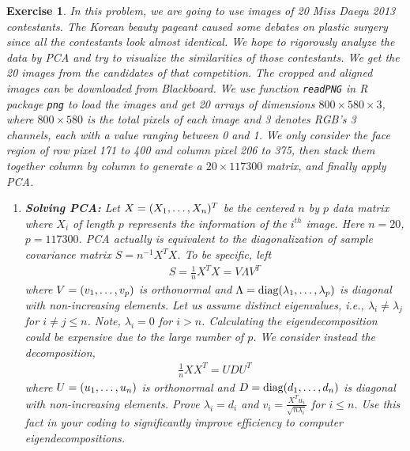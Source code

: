 \documentclass[12pt]{article}
\theoremstyle{colon}
\newtheorem{exercise}{Exercise}
\begin{document}
\begin{exercise}
  In this problem, we are going to use images of 20 Miss Daegu 2013 contestants. The Korean beauty pageant caused some debates on plastic surgery since all the contestants look almost identical. We hope to rigorously analyze the data by PCA and try to visualize the similarities of those contestants. We get the 20 images from the candidates of that competition. The cropped and aligned images can be downloaded from Blackboard. We use function \texttt{readPNG} in R package \texttt{png} to load the images and get 20 arrays of dimensions $800 \times 580 \times 3$, where $800 \times 580$ is the total pixels of each image and 3 denotes RGB's 3 channels, each with a value ranging between 0 and 1. We only consider the face region of row pixel 171 to 400 and column pixel 206 to 375, then stack them together column by column to generate a $20 \times 117300$ matrix, and finally apply PCA.
  \begin{enumerate}[label=\arabic*)]
    \item \textbf{Solving PCA:} Let $X = (X_1, \mathellipsis, X_n)^T$ be the centered $n$ by $p$ data matrix where $X_i$ of length $p$ represents the information of the $i^{th}$ image. Here $n = 20$, $p = 117300$. PCA actually is equivalent to the diagonalization of sample covariance matrix $S = n^{-1} X^T X$. To be specific, left
      \begin{gather*}
        S = \frac{1}{n} X^T X = V \Lambda V^T
      \end{gather*}
      where $V = (v_1, \mathellipsis, v_p)$ is orthonormal and $\Lambda = \text{diag}(\lambda_1, \mathellipsis, \lambda_p)$ is diagonal with non-increasing elements. Let us assume distinct eigenvalues, i.e., $\lambda_i \neq \lambda_j$ for $i \neq j \leq n$. Note, $\lambda_i = 0$ for $i > n$. Calculating the eigendecomposition could be expensive due to the large number of $p$. We consider instead the decomposition,
      \begin{gather*}
        \frac{1}{n} X X^T = U D U^T
      \end{gather*}
      where $U = (u_1, \mathellipsis, u_n)$ is orthonormal and $D = \text{diag}(d_1, \mathellipsis, d_n)$ is diagonal with non-increasing elements. Prove $\lambda_i = d_i$ and $v_i = \frac{X^T u_i}{\sqrt{n \lambda_i}}$ for $i \leq n$. Use this fact in your coding to significantly improve efficiency to computer eigendecompositions.


\end{enumerate}
\end{exercise}
\end{document}
